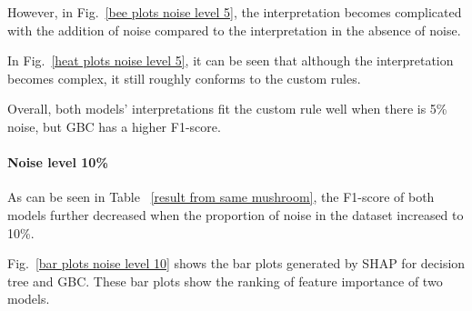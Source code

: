\documentclass[runningheads,a4paper]{llncs}
\begin{document}
However, in Fig.~\ref{bee plots noise level 5}, the interpretation becomes complicated with the addition of noise compared to the interpretation in the absence of noise.

In Fig.~\ref{heat plots noise level 5}, it can be seen that although the interpretation becomes complex, it still roughly conforms to the  custom rules.

Overall, both models' interpretations fit the custom rule well when there is 5\% noise, but GBC has a higher F1-score.
\paragraph{Noise level 10\%}
As can be seen in Table  ~\ref{result from same mushroom}, the F1-score of both models further decreased when the proportion of noise in the dataset increased to 10\%.

Fig.~\ref{bar plots noise level 10} shows the bar plots generated by SHAP for decision tree and GBC. These bar plots show the ranking of feature importance of two models.
\end{document}

